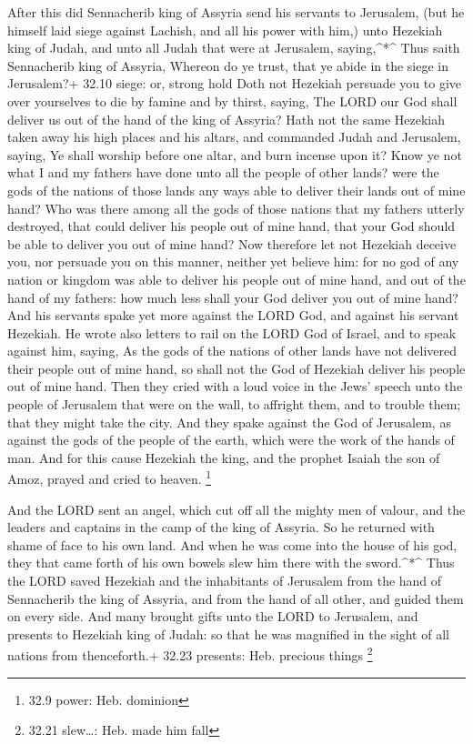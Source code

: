  After this did Sennacherib king of Assyria send his
servants to Jerusalem, (but he himself laid siege against Lachish, and
all his power with him,) unto Hezekiah king of Judah, and unto all Judah
that were at Jerusalem, saying,\^{}*\^{}  Thus saith
Sennacherib king of Assyria, Whereon do ye trust, that ye abide in the
siege in Jerusalem?+ 32.10 siege: or, strong hold  Doth not
Hezekiah persuade you to give over yourselves to die by famine and by
thirst, saying, The LORD our God shall deliver us out of the hand of the
king of Assyria?  Hath not the same Hezekiah taken away his
high places and his altars, and commanded Judah and Jerusalem, saying,
Ye shall worship before one altar, and burn incense upon it?
 Know ye not what I and my fathers have done unto all the
people of other lands? were the gods of the nations of those lands any
ways able to deliver their lands out of mine hand?  Who was
there among all the gods of those nations that my fathers utterly
destroyed, that could deliver his people out of mine hand, that your God
should be able to deliver you out of mine hand?  Now
therefore let not Hezekiah deceive you, nor persuade you on this manner,
neither yet believe him: for no god of any nation or kingdom was able to
deliver his people out of mine hand, and out of the hand of my fathers:
how much less shall your God deliver you out of mine hand? 
And his servants spake yet more against the LORD God, and against his
servant Hezekiah.  He wrote also letters to rail on the
LORD God of Israel, and to speak against him, saying, As the gods of the
nations of other lands have not delivered their people out of mine hand,
so shall not the God of Hezekiah deliver his people out of mine hand.
 Then they cried with a loud voice in the Jews' speech unto
the people of Jerusalem that were on the wall, to affright them, and to
trouble them; that they might take the city.  And they
spake against the God of Jerusalem, as against the gods of the people of
the earth, which were the work of the hands of man.  And
for this cause Hezekiah the king, and the prophet Isaiah the son of
Amoz, prayed and cried to heaven. \footnote{32.9 power: Heb. dominion}

 And the LORD sent an angel, which cut off all the mighty
men of valour, and the leaders and captains in the camp of the king of
Assyria. So he returned with shame of face to his own land. And when he
was come into the house of his god, they that came forth of his own
bowels slew him there with the sword.\^{}*\^{}  Thus the
LORD saved Hezekiah and the inhabitants of Jerusalem from the hand of
Sennacherib the king of Assyria, and from the hand of all other, and
guided them on every side.  And many brought gifts unto the
LORD to Jerusalem, and presents to Hezekiah king of Judah: so that he
was magnified in the sight of all nations from thenceforth.+ 32.23
presents: Heb. precious things \footnote{32.21 slew\ldots: Heb. made him
  fall}

